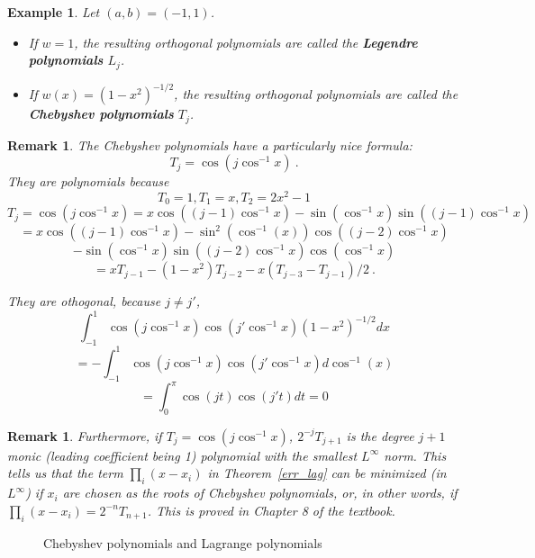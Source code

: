 \documentclass{article} %
\theoremstyle{break}
\newtheorem{exa}[definition]{Example}
\newtheorem{rem}[definition]{Remark}
\begin{document}
\begin{exa}
  Let $(a, b)=(-1, 1)$.
  \begin{itemize}
  \item If $w=1$, the resulting orthogonal polynomials are called the {\bf Legendre polynomials} $L_j$.
  \item If $w(x)=(1-x^2)^{-1/2}$, the resulting orthogonal polynomials are called the {\bf Chebyshev polynomials} $T_j$. 
  \end{itemize}
 \end{exa}

 \begin{rem}
The Chebyshev polynomials have a particularly nice formula:
\[T_j=\cos(j\cos^{-1}x)\ .\]
They are polynomials because
\[T_0=1, T_1=x, T_2=2x^2-1\]
\[T_j=\cos(j\cos^{-1}x)=x\cos((j-1)\cos^{-1}x)-\sin(\cos^{-1}x)\sin((j-1)\cos^{-1}x)\]
\[=x\cos((j-1)\cos^{-1}x)-\sin^2(\cos^{-1}(x))\cos((j-2)\cos^{-1}x)\]
\[-\sin(\cos^{-1}x)\sin((j-2)\cos^{-1}x)\cos(\cos^{-1}x)\]
\[=xT_{j-1}-(1-x^2)T_{j-2}-x(T_{j-3}-T_{j-1})/2\ .\]


 They are othogonal, because $j\not=j'$,
\[\int_{-1}^1 \cos(j\cos^{-1}x)\cos(j'\cos^{-1}x)(1-x^2)^{-1/2}dx\]
\[=-\int_{-1}^{1}\cos(j\cos^{-1}x)\cos(j'\cos^{-1}x)d\cos^{-1}(x)\]
\[=\int_0^\pi\cos(jt)\cos(j't)dt=0\]
\end{rem}

\begin{rem}Furthermore, if $T_j=\cos(j\cos^{-1}x)$, $2^{-j}T_{j+1}$ is the degree $j+1$ monic (leading coefficient being 1) polynomial with the smallest $L^\infty$ norm. This tells us that the term $\prod_i(x-x_i)$ in Theorem~\ref{err_lag} can be minimized (in $L^\infty$) if $x_i$ are chosen as the roots of Chebyshev polynomials, or, in other words, if $\prod_i(x-x_i)=2^{-n}T_{n+1}$. This is proved in Chapter 8 of the textbook.
\end{rem}


\begin{figure}[H]
\caption{Chebyshev polynomials and Lagrange polynomials}
\end{figure}
\end{document}
